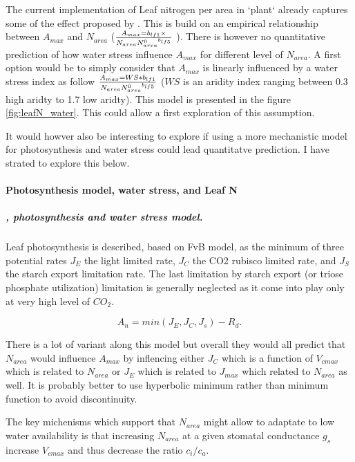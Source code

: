 \documentclass[a4paper,11pt]{article}
\begin{document}
 The current implementation of Leaf nitrogen per area in `plant` already captures some of the effect proposed by \citet{Wright-2003}. This is build on an empirical relationship between $A_{max}$ and $N_{area}$ 
($A_{max} = b_{lf1} \times \over{N_{area}}{N^0_{area}}^{b_{lf5}}$ \citep{Falster-2015}). There is however no quantitative prediction of how water stress influence $A_{max}$ for different level of $N_{area}$. A first option would be to simply consider that $A_{max}$ is linearly influenced by a water stress index  as follow $A_{max} = WS * b_{lf1} \over{N_{area}}{N^0_{area}}^{b_{lf5}}$ ($WS$ is an aridity index ranging between 0.3 high aridty to 1.7 low aridty). This model is presented in the figure \ref{fig:leafN_water}. This could allow a first exploration of this assumption. 

It would howver also be interesting to explore if using a more mechanistic model for photosynthesis and water stress could lead quantitatve prediction. I have strated to explore this below.


\paragraph{Photosynthesis model, water stress, and Leaf N}

\subparagraph{\citet{Collatz-1991}, photosynthesis and water stress model.}




Leaf photosynthesis is described, based on FvB model, as the minimum
of three potential rates $J_E$ the light limited rate, $J_C$ the CO2
rubisco limited rate, and $J_S$ the starch export limitation rate. The
last limitation by starch export (or triose phosphate utilization)
limitation is generally neglected as it come into play only at very
high level of $CO_2$. 

\begin{equation}
\label{eq:An}
A_n= min(J_E, J_C, J_s) - R_d.
\end{equation}

There is a lot of variant along this model but
overall they would all predict that $N_{area}$ would influence
$A_{max}$ by inflencing either $J_C$ which is a function of $V_{cmax}$
which is related to $N_{area}$ or $J_E$ which is related to $J_{max}$
which related to $N_{area}$ as well. It is probably better to use
hyperbolic minimum rather than minimum function to avoid
discontinuity. 

The key michenisms which support that $N_{area}$ might allow to
adaptate to low water availability is that increasing $N_{area}$ at a
given stomatal conductance $g_s$
increase $V_{cmax}$ and thus decrease the ratio $c_i/c_a$.
\end{document}
